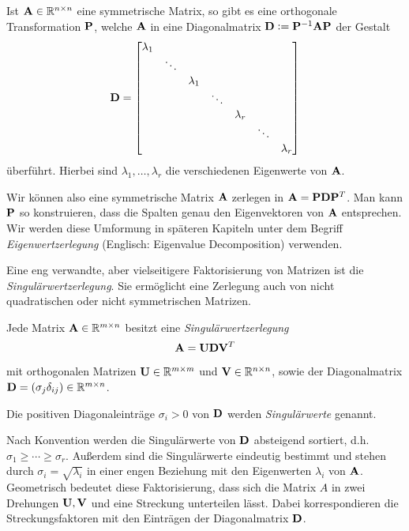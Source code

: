 \begin{thm}
Ist $\mathbf{A} \in \mathbb{R}^{n \times n}$ eine symmetrische Matrix, so gibt es eine orthogonale Transformation $\mathbf{P}$, welche $\mathbf{A}$ in eine Diagonalmatrix $\mathbf{D} \vcentcolon= \mathbf{P}^{-1}\mathbf{A}\mathbf{P}$ der Gestalt
$$\mathbf{D} = \begin{bmatrix}
    \lambda_{1} & & & & & & \\
    & \ddots & & & & & \\
    & & \lambda_1 & & & & \\
    & & & \ddots & & & \\
    & & & &\lambda_r & & \\
    & & & & & \ddots & \\
    & & & & & & \lambda_{r}
  \end{bmatrix}$$
überführt. Hierbei sind $\lambda_1, \ldots, \lambda_r$ die verschiedenen Eigenwerte von $\mathbf{A}$.
\end{thm}

Wir können also eine symmetrische Matrix $\mathbf{A}$ zerlegen in $\mathbf{A} = \mathbf{P} \mathbf{D} \mathbf{P}^T$. Man kann $\mathbf{P}$ so konstruieren, dass die Spalten genau den Eigenvektoren von $\mathbf{A}$ entsprechen. Wir werden diese Umformung in späteren Kapiteln unter dem Begriff \textit{Eigenwertzerlegung} (Englisch: Eigenvalue Decomposition) verwenden. 

Eine eng verwandte, aber vielseitigere Faktorisierung von Matrizen ist die \textit{Singulärwertzerlegung}. Sie ermöglicht eine Zerlegung auch von nicht quadratischen oder nicht symmetrischen Matrizen.

\begin{thm}
Jede Matrix $\mathbf{A} \in \mathbb{R}^{m \times n}$ besitzt eine \textit{Singulärwertzerlegung} 
$$\mathbf{A} = \mathbf{U}\mathbf{D}\mathbf{V}^{T}$$
mit orthogonalen Matrizen $\mathbf{U} \in \mathbb{R}^{m \times m}$ und $\mathbf{V} \in \mathbb{R}^{n \times n}$, sowie der Diagonalmatrix $\mathbf{D} = (\sigma_j\delta_{ij}) \in \mathbb{R}^{m \times n}$.
\end{thm}

\begin{defn}[Singulärwert]
Die positiven Diagonaleinträge $\sigma_{i} > 0$ von $\mathbf{D}$ werden \textit{Singulärwerte} genannt.
\end{defn}

Nach Konvention werden die Singulärwerte von $\mathbf{D}$ absteigend sortiert, d.h. $\sigma _{1} \geq \cdots \geq \sigma _{r}$. Außerdem sind die Singulärwerte eindeutig bestimmt und stehen durch $\sigma_i = \sqrt{\lambda_i}$ in einer engen Beziehung mit den Eigenwerten $\lambda_i$ von $\mathbf{A}$. Geometrisch bedeutet diese Faktorisierung, dass sich die Matrix $A$ in zwei Drehungen $\mathbf{U}, \mathbf{V}$ und eine Streckung unterteilen lässt. Dabei korrespondieren die Streckungsfaktoren mit den Einträgen der Diagonalmatrix $\mathbf{D}$.


